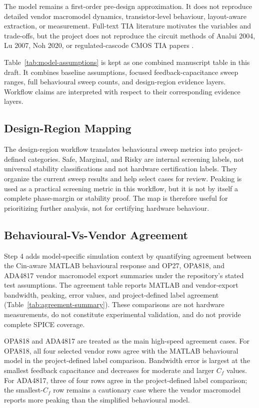 The model remains a first-order pre-design approximation. It does not reproduce detailed vendor macromodel dynamics, transistor-level behaviour, layout-aware extraction, or measurement. Full-text TIA literature motivates the variables and trade-offs, but the project does not reproduce the circuit methods of Analui 2004, Lu 2007, Noh 2020, or regulated-cascode CMOS TIA papers \citep{ANALUI_2004_BW_ENHANCEMENT,LU_2007_BROADBAND_TIA,NOH_2020_CF_TIA_DC_LOOP,PARK_YOO_2004_RGC_TIA}.

Table~\ref{tab:model-assumptions} is kept as one combined manuscript table in this draft. It combines baseline assumptions, focused feedback-capacitance sweep ranges, full behavioural sweep counts, and design-region evidence layers. Workflow claims are interpreted with respect to their corresponding evidence layers.

\subsection{Design-Region Mapping}

The design-region workflow translates behavioural sweep metrics into project-defined categories. Safe, Marginal, and Risky are internal screening labels, not universal stability classifications and not hardware certification labels. They organize the current sweep results and help select cases for review. Peaking is used as a practical screening metric in this workflow, but it is not by itself a complete phase-margin or stability proof. The map is therefore useful for prioritizing further analysis, not for certifying hardware behaviour.

\subsection{Behavioural-Vs-Vendor Agreement}

Step 4 adds model-specific simulation context by quantifying agreement between the Cin-aware MATLAB behavioural response and OP27, OPA818, and ADA4817 vendor macromodel export summaries under the repository's stated test assumptions. The agreement table reports MATLAB and vendor-export bandwidth, peaking, error values, and project-defined label agreement (Table~\ref{tab:agreement-summary}). These comparisons are not hardware measurements, do not constitute experimental validation, and do not provide complete SPICE coverage.

OPA818 and ADA4817 are treated as the main high-speed agreement cases. For OPA818, all four selected vendor rows agree with the MATLAB behavioural model in the project-defined label comparison. Bandwidth error is largest at the smallest feedback capacitance and decreases for moderate and larger $C_f$ values. For ADA4817, three of four rows agree in the project-defined label comparison; the smallest-$C_f$ row remains a cautionary case where the vendor macromodel reports more peaking than the simplified behavioural model.

